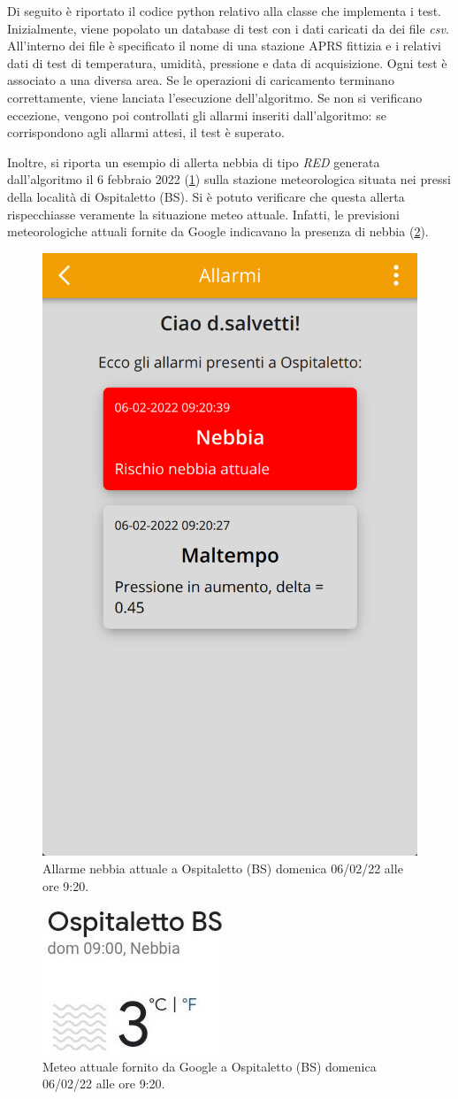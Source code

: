 Di seguito è riportato il codice python relativo alla classe che implementa i test. Inizialmente, viene popolato un database di test con i dati caricati da dei file \textit{csv}. All'interno dei file è specificato il nome di una stazione APRS fittizia e i relativi dati di test di temperatura, umidità, pressione e data di acquisizione. Ogni test è associato a una diversa area.  Se le operazioni di caricamento terminano correttamente, viene lanciata l'esecuzione dell'algoritmo. Se non si verificano eccezione, vengono poi controllati gli allarmi inseriti dall'algoritmo: se corrispondono agli allarmi attesi, il test è superato.

\begingroup
\UseRawInputEncoding

\endgroup

Inoltre, si riporta un esempio di allerta nebbia di tipo \textit{RED} generata dall'algoritmo il 6 febbraio 2022 (\Fig\ref{fig:test_previsione_alg}) sulla stazione meteorologica situata nei pressi della località di Ospitaletto (BS). Si è potuto verificare che questa allerta rispecchiasse veramente la situazione meteo attuale. Infatti, le previsioni meteorologiche attuali fornite da Google indicavano la presenza di nebbia (\Fig\ref{fig:test_previsione_google}).

\begin{figure}[h!]
	\centering
	\includegraphics[width=0.3\linewidth]{./Iterazione 3/ImageFiles/testAppRedFog}
	\caption{Allarme nebbia attuale a Ospitaletto (BS) domenica 06/02/22 alle ore 9:20.}
	\label{fig:test_previsione_alg}
\end{figure}

\begin{figure}[h!]
	\centering
	\includegraphics[width=0.2\linewidth]{./Iterazione 3/ImageFiles/Nebbia Ospitaletto Google}
	\caption{Meteo attuale fornito da Google a Ospitaletto (BS) domenica 06/02/22 alle ore 9:20.}
	\label{fig:test_previsione_google}
\end{figure}

